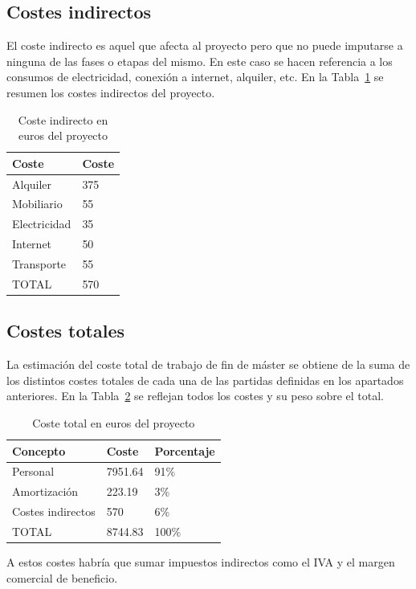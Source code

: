 \subsection{Costes indirectos}

El coste indirecto es aquel que afecta al proyecto pero que no puede imputarse a ninguna de las fases o etapas del mismo.
En este caso se hacen referencia a los consumos de electricidad, conexión a internet, alquiler, etc.
En la Tabla~\ref{tab:coste-indirecto} se resumen los costes indirectos del proyecto.

\begin{table}[H]
    \centering
    \begin{tabular}{ll}
        \toprule
        Coste        & Coste \\
        \midrule
        Alquiler     & 375   \\
        Mobiliario   & 55    \\
        Electricidad & 35    \\
        Internet     & 50    \\
        Transporte   & 55    \\
        \midrule
        TOTAL        & 570   \\
        \bottomrule
    \end{tabular}
    \caption{Coste indirecto en euros del proyecto}
    \label{tab:coste-indirecto}
\end{table}

\subsection{Costes totales}

La estimación del coste total de trabajo de fin de máster se obtiene de la suma de los distintos costes totales de cada una de las partidas definidas en los apartados anteriores.
En la Tabla~\ref{tab:coste-total} se reflejan todos los costes y su peso sobre el total.

\begin{table}[H]
    \centering
    \begin{tabular}{lll}
        \toprule
        Concepto          & Coste   & Porcentaje \\
        \midrule
        Personal          & 7951.64 & 91\%       \\
        Amortización      & 223.19  & 3\%        \\
        Costes indirectos & 570     & 6\%        \\
        \midrule
        TOTAL             & 8744.83 & 100\%      \\
        \bottomrule
    \end{tabular}
    \caption{Coste total en euros del proyecto}
    \label{tab:coste-total}
\end{table}

A estos costes habría que sumar impuestos indirectos como el IVA y el margen comercial de beneficio.